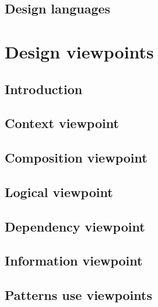 \documentclass[letterpaper, 10pt, draftclsnofoot, compsoc, onecolumn]{IEEEtran}
\begin{document}
\subsection{Design languages}
{\noindent \par}






\section{Design viewpoints}
{\noindent \par}

\subsection{Introduction}
{\noindent \par}

\subsection{Context viewpoint}
{\noindent \par}

\subsection{Composition viewpoint}
{\noindent \par}

\subsection{Logical viewpoint}
{\noindent \par}

\subsection{Dependency viewpoint}
{\noindent \par}

\subsection{Information viewpoint}
{\noindent \par}

\subsection{Patterns use viewpoints}
{\noindent \par}
\end{document}
